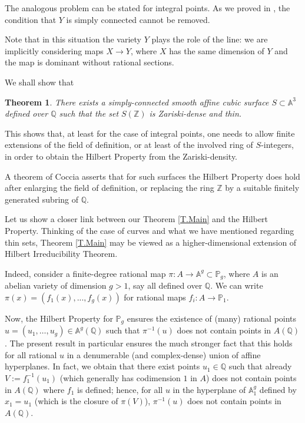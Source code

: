 \documentclass[leqno,12pt]{article} %
\def\A{{{\mathbb A}}}
\def\Z{{{\mathbb Z}}}
\def\Q{{{\mathbb Q}}}
\def\P{{{\mathbb P}}}
\theoremstyle{plain} %
\newtheorem{theorem}{\indent\sc Theorem}[section]
\theoremstyle{definition} %
\begin{document}
The analogous problem can be  stated for integral points. As we proved in \cite{CZhilb}, the condition that $Y$ is simply connected cannot be removed.


Note that in this situation the variety $Y$ plays the role of the line: we are implicitly considering maps $X\to Y$, where $X$ has the same dimension of $Y$ and the map is dominant without rational sections.


We shall show that

\begin{theorem}\label{T.dense-and-thin}
There exists a simply-connected smooth affine cubic surface $S\subset \A^3$ defined over $\Q$ such that the set $S(\Z)$ is Zariski-dense and thin.
\end{theorem}

This shows that, at least for the case of integral points, one needs to allow finite extensions of the field of definition, or at least of the involved ring of $S$-integers, in order to obtain the Hilbert Property from the Zariski-density.


A theorem of {\sc Coccia} \cite{Coccia} asserts that for such surfaces the Hilbert Property does hold  after enlarging the field of definition, or replacing the ring $\Z$ by a suitable finitely generated subring of $\Q$. 


\medskip

Let us show a closer link between our Theorem \ref{T.Main} and    the Hilbert Property. 
 Thinking of the case of curves and what we have mentioned regarding thin sets, Theorem \ref{T.Main} may be viewed as a higher-dimensional extension of Hilbert Irreducibility Theorem.
 
 Indeed, consider a finite-degree rational map $\pi:A\to \A^g\subset \P_g$, where $A$ is an abelian variety of dimension $g>1$, say all defined over $\Q$. %
 We can write $\pi(x)=(f_1(x),...,f_g(x))$ for rational maps $f_i:A\to\P_1$. 
 
  Now, the Hilbert Property for $\P_g$ ensures the existence of (many) rational points $u=(u_1,\ldots ,u_g)\in\A^g(\Q)$ such that $\pi^{-1}(u)$ does not contain points in $A(\Q)$.  The present result  in particular ensures the much stronger fact that this holds for all rational $u$ in a denumerable (and complex-dense) union of affine hyperplanes. In fact, we obtain that there exist points $u_1\in\Q$ such that already $V:=f_1^{-1}(u_1)$ (which generally has codimension $1$ in $A$) does not contain points in $A(\Q)$ where $f_1$ is defined;  hence,  for all $u$ in the hyperplane of $\A_1^g$ defined by $x_1=u_1$ (which is the closure of $ \pi(V)$), $\pi^{-1}(u)$ does not contain points in $A(\Q)$.  %
  
\end{document}
